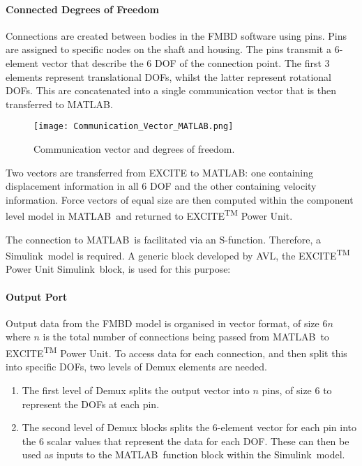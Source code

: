 \paragraph{Connected Degrees of Freedom}

Connections are created between bodies in the FMBD software using pins. Pins are assigned to specific nodes on the shaft and housing. The pins transmit a 6-element vector that describe the 6 DOF of the connection point. The first 3 elements represent translational DOFs, whilst the latter represent rotational DOFs. This are concatenated into a single communication vector that is then transferred to MATLAB{\textregistered}.

\begin{figure}
	\centering  
	\texttt{[image: Communication\_Vector\_MATLAB.png]}
	\caption{Communication vector and degrees of freedom.}
	\label{Communication_Vector_MATLAB}
\end{figure} 

Two vectors are transferred from EXCITE to MATLAB{\textregistered}: one containing displacement information in all 6 DOF and the other containing velocity information. Force vectors of equal size are then computed within the component level model in MATLAB\textregistered\ and returned to EXCITE\textsuperscript{TM} Power Unit.

The connection to MATLAB\textregistered\ is facilitated via an S-function. Therefore, a Simulink\textregistered\ model is required. A generic block developed by AVL, the EXCITE\textsuperscript{TM} Power Unit Simulink\textregistered\ block, is used for this purpose:

\paragraph{Output Port}

Output data from the FMBD model is organised in vector format, of size 6$n$ where $n$ is the total number of connections being passed from MATLAB\textregistered\ to EXCITE\textsuperscript{TM} Power Unit. To access data for each connection, and then split this into specific DOFs, two levels of Demux elements are needed.

\begin{enumerate}
	\item The first level of Demux splits the output vector into $n$ pins, of size 6 to represent the DOFs at each pin. 
	\item The second level of Demux blocks splits the 6-element vector for each pin into the 6 scalar values that represent the data for each DOF. These can then be used as inputs to the MATLAB\textregistered\ function block within the Simulink\textregistered\ model.	
\end{enumerate}


